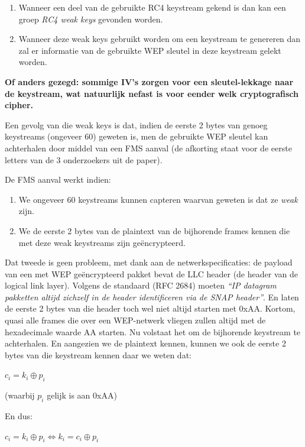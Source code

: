 \documentclass[
  10pt,
  dutch,
  paper=a4,
  ,captions=tableheading
]{scrbook}
\providecommand{\tightlist}{%
  \setlength{\itemsep}{0pt}\setlength{\parskip}{0pt}}
\begin{document}
\begin{enumerate}
\def\labelenumi{\arabic{enumi}.}
\tightlist
\item
  Wanneer een deel van de gebruikte RC4 keystream gekend is dan kan een
  groep \emph{RC4 weak keys} gevonden worden.
\item
  Wanneer deze weak keys gebruikt worden om een keystream te genereren
  dan zal er informatie van de gebruikte WEP sleutel in deze keystream
  gelekt worden.
\end{enumerate}

\textbf{Of anders gezegd: sommige IV's zorgen voor een sleutel-lekkage
naar de keystream, wat natuurlijk nefast is voor eender welk
cryptografisch cipher.}

Een gevolg van die weak keys is dat, indien de eerste 2 bytes van genoeg
keystreams (ongeveer 60) geweten is, men de gebruikte WEP sleutel kan
achterhalen door middel van een FMS aanval (de afkorting staat voor de
eerste letters van de 3 onderzoekers uit de paper).

De FMS aanval werkt indien:

\begin{enumerate}
\def\labelenumi{\arabic{enumi}.}
\tightlist
\item
  We ongeveer 60 keystreams kunnen capteren waarvan geweten is dat ze
  \emph{weak} zijn.
\item
  We de eerste 2 bytes van de plaintext van de bijhorende frames kennen
  die met deze weak keystreams zijn geëncrypteerd.
\end{enumerate}

Dat tweede is geen probleem, met dank aan de netwerkspecificaties: de
payload van een met WEP geëncrypteerd pakket bevat de LLC header (de
header van de logical link layer). Volgens de standaard (RFC 2684)
moeten \emph{``IP datagram pakketten altijd zichzelf in de header
identificeren via de SNAP header''}. En laten de eerste 2 bytes van die
header toch wel niet altijd starten met 0xAA. Kortom, quasi alle frames
die over een WEP-netwerk vliegen zullen altijd met de hexadecimale
waarde AA starten. Nu volstaat het om de bijhorende keystream te
achterhalen. En aangezien we de plaintext kennen, kunnen we ook de
eerste 2 bytes van die keystream kennen daar we weten dat:

\(c_i = k_i \oplus p_i\)

(waarbij \(p_i\) gelijk is aan 0xAA)

En dus:

\(c_i = k_i \oplus p_i \Leftrightarrow k_i = c_i \oplus p_i\)
\end{document}
